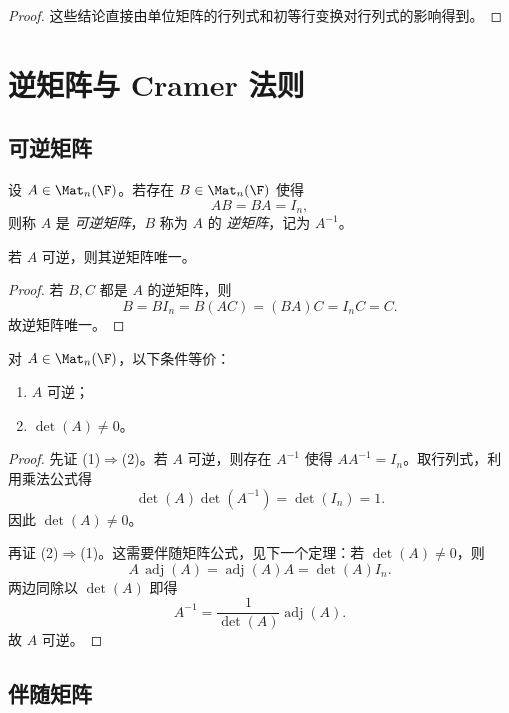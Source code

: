 \begin{proof}
这些结论直接由单位矩阵的行列式和初等行变换对行列式的影响得到。
\end{proof}

\section{逆矩阵与 Cramer 法则}

\subsection{可逆矩阵}

\begin{definition}
设 $A\in\Mat_n(\F)$。若存在 $B\in\Mat_n(\F)$ 使得
\[
AB=BA=I_n,
\]
则称 $A$ 是 \emph{可逆矩阵}，$B$ 称为 $A$ 的 \emph{逆矩阵}，记为 $A^{-1}$。
\end{definition}

\begin{proposition}[逆矩阵的唯一性]
若 $A$ 可逆，则其逆矩阵唯一。
\end{proposition}

\begin{proof}
若 $B,C$ 都是 $A$ 的逆矩阵，则
\[
B=BI_n=B(AC)=(BA)C=I_nC=C.
\]
故逆矩阵唯一。
\end{proof}

\begin{theorem}[可逆判别准则]
对 $A\in\Mat_n(\F)$，以下条件等价：
\begin{enumerate}[label=(\arabic*)]
  \item $A$ 可逆；
  \item $\det(A)\ne 0$。
\end{enumerate}
\end{theorem}

\begin{proof}
先证 (1)$\Rightarrow$(2)。若 $A$ 可逆，则存在 $A^{-1}$ 使得 $AA^{-1}=I_n$。取行列式，利用乘法公式得
\[
\det(A)\det(A^{-1})=\det(I_n)=1.
\]
因此 $\det(A)\ne 0$。

再证 (2)$\Rightarrow$(1)。这需要伴随矩阵公式，见下一个定理：若 $\det(A)\ne 0$，则
\[
A\,\operatorname{adj}(A)=\operatorname{adj}(A)A=\det(A)I_n.
\]
两边同除以 $\det(A)$ 即得
\[
A^{-1}=\frac{1}{\det(A)}\operatorname{adj}(A).
\]
故 $A$ 可逆。
\end{proof}

\subsection{伴随矩阵}

